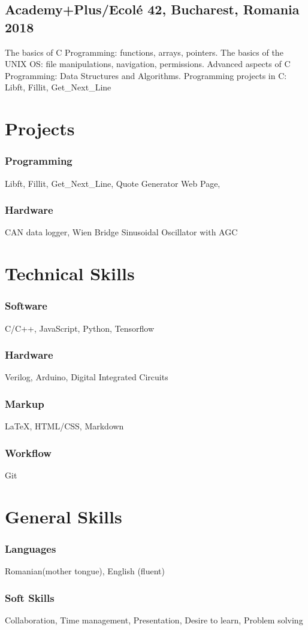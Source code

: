 \documentclass{article}
\begin{document}
\subsection{Academy+Plus/Ecol{\'e} 42, Bucharest, Romania 2018}
The basics of C Programming: functions, arrays, pointers.
The basics of the UNIX OS: file manipulations, navigation, permissions.
Advanced aspects of C Programming: Data Structures and Algorithms.
Programming projects in C: Libft, Fillit, Get\_Next\_Line

\section{Projects}
\subsubsection{Programming}
Libft, Fillit, Get\_Next\_Line, Quote Generator Web Page,  
\subsubsection{Hardware}
CAN data logger, Wien Bridge Sinusoidal Oscillator with AGC


\section{Technical Skills}
\subsubsection{Software}
C/C++, JavaScript, Python, Tensorflow
\subsubsection{Hardware}
Verilog, Arduino, Digital Integrated Circuits
\subsubsection{Markup}
{\LaTeX}, HTML/CSS, Markdown
\subsubsection{Workflow}
Git

\section{General Skills}
\subsubsection{Languages}
Romanian(mother tongue), English (fluent)
\subsubsection{Soft Skills}
Collaboration, Time management, Presentation, Desire to learn, Problem solving
\end{document}
